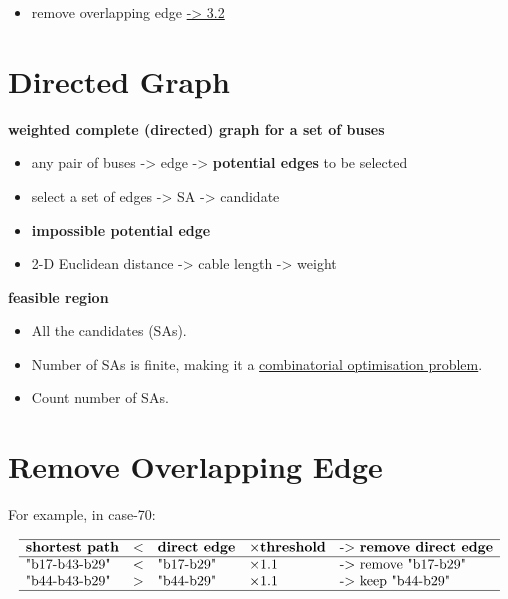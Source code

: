 \documentclass[
]{book}
\providecommand{\tightlist}{%
  \setlength{\itemsep}{0pt}\setlength{\parskip}{0pt}}
\begin{document}
\begin{itemize}
\tightlist
\item
  remove overlapping edge \protect\hyperlink{overlapping}{-\textgreater{} 3.2}
\end{itemize}

\hypertarget{directed}{%
\section{Directed Graph}\label{directed}}

\textbf{weighted complete (directed) graph for a set of buses}

\begin{itemize}
\tightlist
\item
  any pair of buses -\textgreater{} edge -\textgreater{} \textbf{potential edges} to be selected
\item
  select a set of edges -\textgreater{} SA -\textgreater{} candidate
\item
  \textbf{impossible potential edge}
\item
  2-D Euclidean distance -\textgreater{} cable length -\textgreater{} weight
\end{itemize}

\textbf{feasible region}

\begin{itemize}
\tightlist
\item
  All the candidates (SAs).
\item
  Number of SAs is finite, making it a \protect\hyperlink{combinatorial}{combinatorial
  optimisation problem}.
\item
  Count number of SAs.
\end{itemize}

\hypertarget{overlapping}{%
\section{Remove Overlapping Edge}\label{overlapping}}

For example, in case-70:

\[
\begin{array}{lllll}
  \hline
  \textbf{shortest path} & <
  & \textbf{direct edge} & \times \textbf{threshold}
  & \text{-> } \textbf{remove direct edge} \\
  \hline
  \text{"b17‐b43-b29"} & < & \text{"b17-b29"} & \times 1.1
  & \text{-> remove "b17-b29"} \\
  \text{"b44‐b43-b29"} & > & \text{"b44-b29"} & \times 1.1
  & \text{-> keep "b44-b29"} \\
  \hline
\end{array}
\]
\end{document}
